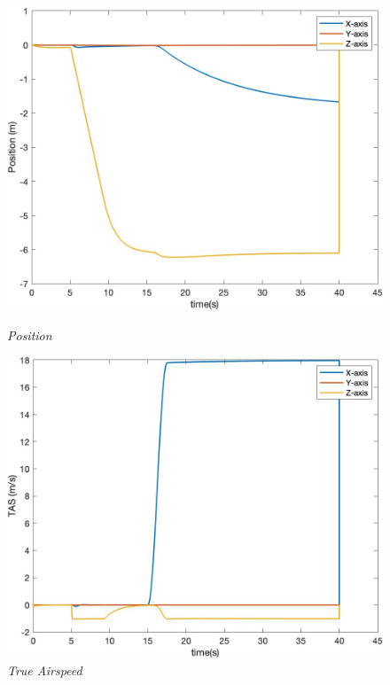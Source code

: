 \begin{figure}[htbp]
  \centering
  \begin{minipage}[b]{0.45\textwidth}
    \centering
    \includegraphics[width=\textwidth]{Images/Gust/VTOL step/1 position_1.jpg}
    \caption*{\textit{Position}}
  \end{minipage}
  \hfil
  \begin{minipage}[b]{0.45\textwidth}
    \centering
    \includegraphics[width=\textwidth]{Images/Gust/VTOL step/2 airspeed_1.jpg}
    \caption*{\textit{True Airspeed}}
  \end{minipage}
  \begin{minipage}[b]{0.45\textwidth}

\end{minipage}
\end{figure}
